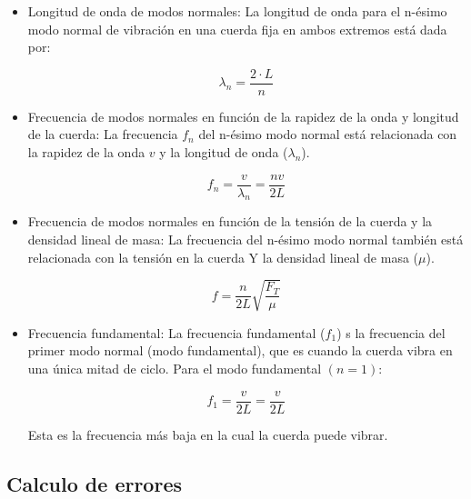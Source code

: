 \documentclass[twocolumn, 12pt]{article}
\begin{document}
\begin{itemize}[label=$\triangleright$]
    \item Longitud de onda de modos normales: La longitud de onda
          para el n-ésimo modo normal de vibración en una cuerda fija
          en ambos extremos está dada por:

          \begin{equation}
              \lambda_{n} = \frac{2 \cdot L}{n}
              \label{eq:n_lambda}
          \end{equation}

    \item Frecuencia de modos normales en función de la rapidez de la
          onda y longitud de la cuerda: La frecuencia $f_n$ del
          n-ésimo modo normal está relacionada con la rapidez de la
          onda $v$ y la longitud de onda ($\lambda_{n}$).

          \begin{equation*}
              f_n = \frac{v}{\lambda_{n}} = \frac{n v}{2L}
          \end{equation*}

    \item Frecuencia de modos normales en función de la tensión de la
          cuerda y la densidad lineal de masa: La frecuencia del
          n-ésimo modo normal también está relacionada con la tensión
          en la cuerda Y la densidad lineal de masa ($\mu$).

          \begin{equation}
              f = \frac{n}{2 L} \sqrt{\frac{F_T}{\mu}}
              \label{eq:n_frecuencia}
          \end{equation}

    \item Frecuencia fundamental: La frecuencia fundamental ($f_{1}$)
          s la frecuencia del primer modo normal (modo fundamental),
          que es cuando la cuerda vibra en una única mitad de ciclo.
          Para el modo fundamental $(n=1)$:

          \begin{equation*}
              f_{1} = \frac{v}{2L} = \frac{v}{2L}
          \end{equation*}

          Esta es la frecuencia más baja en la cual la cuerda puede
          vibrar.
\end{itemize}

\subsection{Calculo de errores}
\end{document}

